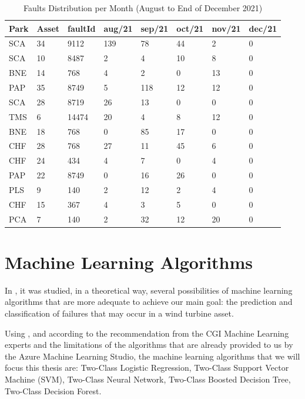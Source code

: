 \begin{table}[!ht]
    \centering
    \begin{tabular}{|l|l|l|l|l|l|l|l|}
    \hline
        Park & Asset & faultId & aug/21 & sep/21 & oct/21 & nov/21 & dec/21 \\ \hline
        SCA & 34 & 9112 & 139 & 78 & 44 & 2 & 0 \\ \hline
        SCA & 10 & 8487 & 2 & 4 & 10 & 8 & 0 \\ \hline
        BNE & 14 & 768 & 4 & 2 & 0 & 13 & 0 \\ \hline
        PAP & 35 & 8749 & 5 & 118 & 12 & 12 & 0 \\ \hline
        SCA & 28 & 8719 & 26 & 13 & 0 & 0 & 0 \\ \hline
        TMS & 6 & 14474 & 20 & 4 & 8 & 12 & 0 \\ \hline
        BNE & 18 & 768 & 0 & 85 & 17 & 0 & 0 \\ \hline
        CHF & 28 & 768 & 27 & 11 & 45 & 6 & 0 \\ \hline
        CHF & 24 & 434 & 4 & 7 & 0 & 4 & 0 \\ \hline
        PAP & 22 & 8749 & 0 & 16 & 26 & 0 & 0 \\ \hline
        PLS & 9 & 140 & 2 & 12 & 2 & 4 & 0 \\ \hline
        CHF & 15 & 367 & 4 & 3 & 5 & 0 & 0 \\ \hline
        PCA & 7 & 140 & 2 & 32 & 12 & 20 & 0 \\ \hline
    \end{tabular}
    \caption{Faults Distribution per Month (August to End of December 2021)}
    \label{FaultsDistribitutionAugDec21}
\end{table}


\section{Machine Learning Algorithms} 
\label{sub:if_you_use_this_template} 

In \cite{OLD_15_WIND} \cite{40_WIND} \cite{OLD_36_SOLAR}, it was studied, in a theoretical way, several possibilities of machine learning algorithms that are more adequate to achieve our main goal: the prediction and classification of failures that may occur in a wind turbine asset.

Using \cite{OLD_15_WIND} \cite{OLD_53_WIND} \cite{40_WIND} \cite{ML_Alg_Analysis}, \cite{ML_Data_processing} and according to the recommendation from the CGI Machine Learning experts and the limitations of the algorithms that are already provided to us by the Azure Machine Learning Studio, the machine learning algorithms that we will focus this thesis are: Two-Class Logistic Regression, Two-Class Support Vector Machine (SVM), Two-Class Neural Network, Two-Class Boosted Decision Tree, Two-Class Decision Forest.

